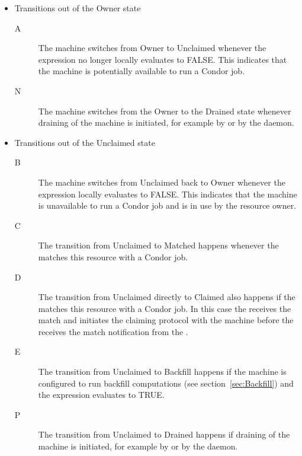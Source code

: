 \begin{itemize}


\item Transitions out of the Owner state

\begin{description}

\item[A] The machine switches from Owner to Unclaimed whenever the
   expression no longer locally evaluates to FALSE.
  This indicates that the machine is potentially available to run a
  Condor job.

\item[N] The machine switches from the Owner to the Drained state
  whenever draining of the machine is initiated,
  for example by  or by the  daemon.

\end{description}


\item Transitions out of the Unclaimed state

\begin{description}

\item[B] The machine switches from Unclaimed back to Owner whenever the
   expression locally evaluates to FALSE.
  This indicates that the machine is unavailable to run a Condor job
  and is in use by the resource owner.

\item[C] The transition from Unclaimed to Matched happens whenever the
   matches this resource with a Condor job.

\item[D] The transition from Unclaimed directly to Claimed also happens
  if the  matches this resource with a Condor job.
  In this case the  receives the match and initiates
  the claiming protocol with the machine before the 
  receives the match notification from the .

\item[E] The transition from Unclaimed to Backfill happens if the
  machine is configured to run backfill computations (see
  section~\ref{sec:Backfill}) and the 
  expression evaluates to TRUE.

\item[P] The transition from Unclaimed to Drained happens
  if draining of the machine is initiated,
  for example by  or by the  daemon.


\end{description}
\end{itemize}
